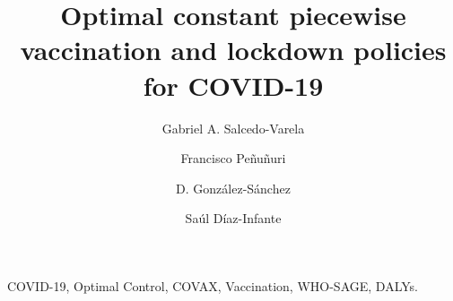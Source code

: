 \begin{frontmatter}
    \title{
        Optimal constant piecewise vaccination and lockdown
        policies for COVID-19
    }
    \author[add:unison]%
    {Gabriel A. Salcedo-Varela
    }
    \address[add:unison]{
        Departamento de Matem\'aticas, Universidad de Sonora,
        Blvd. Luis Encinas y Rosales S/N,
        Hermosillo, Sonora, M\'exico, C.P. 83000.
    }
    \author[add:UADY]%
    {Francisco Pe\~nu\~nuri}
    \address[add:UADY]{Facultad de Ingenier\'ia, Universidad
    Aut\'onoma de Yucat\'an, A.P. 150, Cordemex, M\'erida, Yucat\'an,
    M\'exico.}
    \author[add:conacyt_unison]{D. Gonz\'alez-S\'anchez}
        \address[add:conacyt_unison]{
        CONACYT-Universidad de Sonora,
        Departamento de Matem\'aticas,
        Blvd. Luis Encinas y Rosales S/N,
        Hermosillo, Sonora, M\'exico, C.P. 83000.
    }
    \author[add:conacyt_unison]{%
        Sa\'ul D\'iaz-Infante%
    }%
    \begin{keyword}
        COVID-19, Optimal Control, COVAX,
        Vaccination, WHO-SAGE, DALYs.
    \end{keyword}
    
\end{frontmatter}